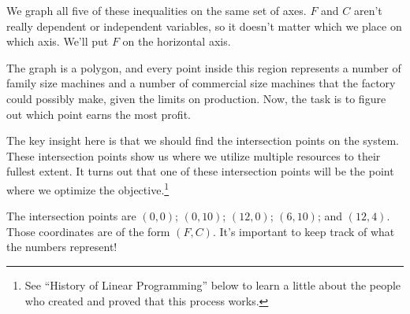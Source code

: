 We graph all five of these inequalities on the same set of axes. $F$ and $C$ aren't really dependent or independent variables, so it doesn't matter which we place on which axis. We'll put $F$ on the horizontal axis.

\begin{center}
\end{center}

The graph is a polygon, and every point inside this region represents a number of family size machines and a number of commercial size machines that the factory could possibly make, given the limits on production. Now, the task is to figure out which point earns the most profit.

The key insight here is that we should find the intersection points on the system. These intersection points show us where we utilize multiple resources to their fullest extent. It turns out that one of these intersection points will be the point where we optimize the objective.\footnote{See ``History of Linear Programming'' below to learn a little about the people who created and proved that this process works.}

The intersection points are $(0,0)$; $(0, 10)$; $(12, 0)$; $(6, 10)$; and $(12, 4)$. Those coordinates are of the form $(F,C)$. It's important to keep track of what the numbers represent!

